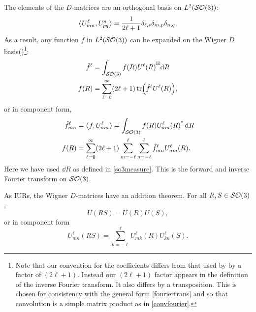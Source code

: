 \documentclass[../../main.tex]{subfiles}
\begin{document}
\begin{refsection}
	The elements of the $D$-matrices are an orthogonal basis on $L^2(\mathcal{SO} (3))$:
	\begin{equation} \label{wignerorthog}
		\left\langle  U^\ell_{mn} ,  U^s_{pq}  \right\rangle = \frac{1}{2\ell+1} \delta_{\ell, s} \delta_{m,p} \delta_{n,q}.
	\end{equation}
	As a result, any function $f$ in $L^2(\mathcal{SO} (3))$ can be expanded on the Wigner $D$ basis(\cite[Section 4.10]{varshalovichQuantumTheoryAngular1988})\footnote{
		Note that our convention for the coefficients differs from that used by \cite{varshalovichQuantumTheoryAngular1988} by a factor of $(2\ell+1)$.
		Instead our $(2\ell+1)$ factor appears in the definition of the inverse Fourier transform.
		It also differs by a transposition.
		This is chosen for consistency with the general form \cref{fouriertrans} and so that convolution is a simple matrix product as in \cref{convfourier}.
	}:
	\begin{align}\label{fourier_so3}
		\hat{f}^\ell & = \int_{\mathcal{SO} (3)} f(R) {U^\ell(R)}^\mathrm{H} \dd R                       \\
		f(R)          & = \sum_{\ell=0}^\infty (2\ell + 1) \tr( \hat{f}^\ell U^\ell(R) ),
	\end{align}
	or in component form,
	\begin{align}\label{fourier_so3_component}
		\hat{f}^\ell_{mn} & = \left\langle f, U^\ell_{nm} \right\rangle = \int_{\mathcal{SO} (3)} f(R) {U^\ell_{nm}(R)}^* \dd{R}                                        \\
		f(R)               & = \sum_{\ell=0}^\infty (2\ell + 1) \sum_{m=-\ell}^{\ell} \sum_{n=-\ell}^{\ell} \hat{f}^\ell_{mn} U^\ell_{nm}(R).
	\end{align}
	Here we have used $\dd{R}$ as defined in \cref{so3measure}.
	This is the forward and inverse Fourier transform on $\mathcal{SO} (3)$.

	As IURs, the Wigner $D$-matrices have an addition theorem.
	For all $R, S \in \mathcal{SO} (3)$,
	$$U(R S) = U(R) U(S),$$
	or in component form
	$$U^\ell_{mn}(R S) = \sum_{k=-\ell}^\ell U^\ell_{mk}(R) U^\ell_{kn}(S).$$


\end{refsection}
\end{document}
